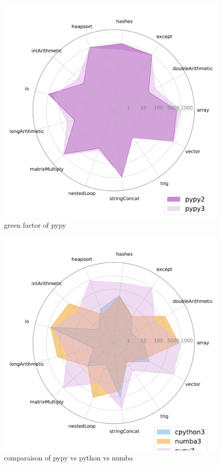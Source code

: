 \begin{figure}
    \centering
    \includegraphics[width=\linewidth]{imgs/tommti_compare__pypy2_pypy3}
    \caption{green factor of pypy }
    \label{fig:pypy2vspypy3}
\end{figure}

\begin{figure}
    \centering
    \includegraphics[width=\linewidth]{imgs/tommti_compare__cpython3_numba3_pypy3}
    \caption{comparaison of pypy vs python vs numba }
    \label{fig:p3}
\end{figure}

